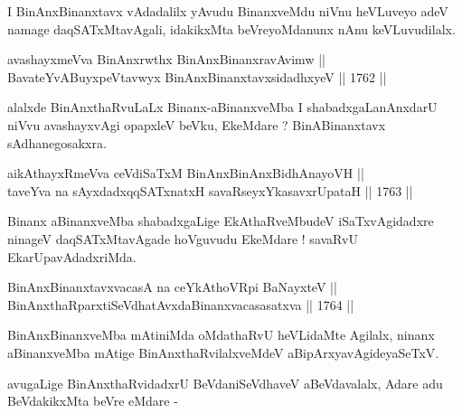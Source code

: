 \begin{artha}
I BinAnxBinanxtavx vAdadalilx yAvudu BinanxveMdu niVnu heVLuveyo adeV
namage daqSATxMtavAgali, idakikxMta beVreyoMdanunx nAnu keVLuvudilalx.
\end{artha}


\begin{shl}
avashayxmeVva BinAnxrwthx BinAnxBinanxravAvimw || \\
BavateYvABuyxpeVtavwyx BinAnxBinanxtavxsidadhxyeV \hfill || 1762 ||  
\end{shl}	

\begin{artha}
alalxde BinAnxthaRvuLaLx Binanx-aBinanxveMba I shabadxgaLanAnxdarU niVvu
avashayxvAgi opapxleV beVku, EkeMdare ? BinABinanxtavx sAdhanegosakxra.
\end{artha}


\begin{shl}
aikAthayxRmeVva ceVdiSaTxM BinAnxBinAnxBidhAnayoVH ||  \\
taveYva na sAyxdadxqqSATxnatxH savaRseyxYkasavxrUpataH \hfill || 1763 ||  
\end{shl}

\begin{artha}
Binanx aBinanxveMba shabadxgaLige EkAthaRveMbudeV iSaTxvAgidadxre
ninageV daqSATxMtavAgade hoVguvudu EkeMdare ! savaRvU
EkarUpavAdadxriMda.
\end{artha}


\begin{shl}
BinAnxBinanxtavxvacasA na ceYkAthoVR\s pi BaNayxteV ||  \\
BinAnxthaRparxtiSeVdhatAvxdaBinanxvacasasatxva \hfill || 1764 ||  
\end{shl}

\begin{artha}
BinAnxBinanxveMba mAtiniMda oMdathaRvU heVLidaMte Agilalx, ninanx
aBinanxveMba mAtige BinAnxthaRvilalxveMdeV aBipArxyavAgideyaSeTxV.
\end{artha}

\begin{artha}
avugaLige BinAnxthaRvidadxrU BeVdaniSeVdhaveV aBeVdavalalx, Adare adu
BeVdakikxMta beVre eMdare -
\end{artha}

